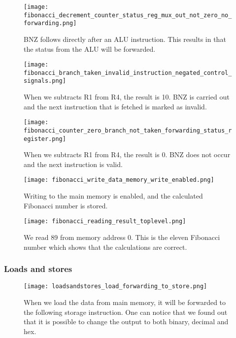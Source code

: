 \documentclass[11pt]{article}
\begin{document}
\begin{figure}[!h]
\texttt{[image: fibonacci\_decrement\_counter\_status\_reg\_mux\_out\_not\_zero\_no\_forwarding.png]}
\caption{BNZ follows directly after an ALU instruction. This results in that the status from the ALU will be forwarded.}
\label{fig:register_write}
\end{figure}

\begin{figure}[!h]
\texttt{[image: fibonacci\_branch\_taken\_invalid\_instruction\_negated\_control\_signals.png]}
\caption{When we subtracts R1 from R4, the result is 10. BNZ is carried out and the next instruction that is fetched is marked as invalid.}
\label{fig:register_write}
\end{figure}

\pagebreak

\begin{figure}[!h]
\texttt{[image: fibonacci\_counter\_zero\_branch\_not\_taken\_forwarding\_status\_register.png]}
\caption{When we subtracts R1 from R4, the result is 0. BNZ does not occur and the next instruction is valid.}
\label{fig:register_write}
\end{figure}

\pagebreak

\begin{figure}[!h]
\texttt{[image: fibonacci\_write\_data\_memory\_write\_enabled.png]}
\caption{Writing to the main memory is enabled, and the calculated Fibonacci number is stored.}
\label{fig:register_write}
\end{figure}

\pagebreak


\begin{figure}[!h]
\texttt{[image: fibonacci\_reading\_result\_toplevel.png]}
\caption{We read 89 from memory address 0. This is the eleven Fibonacci number which shows that the calculations are correct.}
\label{fig:register_write}
\end{figure}

\subsubsection*{Loads and stores}
\begin{figure}[!h]
\texttt{[image: loadsandstores\_load\_forwarding\_to\_store.png]}
\caption{When we load the data from main memory, it will be forwarded to the following storage instruction. One can notice that we found out that it is possible to change the output to both binary, decimal and hex.}
\label{fig:register_write}
\end{figure}
\end{document}

